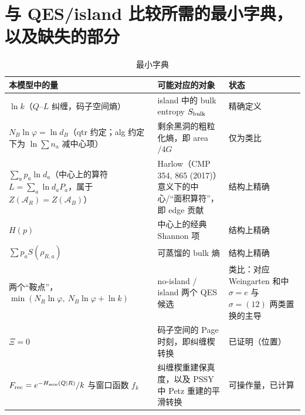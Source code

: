 \documentclass[11pt,a4paper,UTF8]{ctexart}
\newcommand{\Frec}{F_{\rm rec}}
\begin{document}
\section{与 QES/island 比较所需的最小字典，以及缺失的部分}\label{sec:island}

\begin{table}[htbp]
\centering\small
\caption{最小字典}
\begin{tabularx}{\textwidth}{>{\raggedright\arraybackslash}X>{\raggedright\arraybackslash}X>{\raggedright\arraybackslash}p{3.3cm}}
\toprule
本模型中的量 & 可能对应的对象 & 状态\\
\midrule
$\ln k$（$Q$--$L$ 纠缠，码子空间熵） & island 中的 bulk entropy $S_{\rm bulk}$ & 精确定义\\
$N_B\ln\varphi=\ln d_B$（qtr 约定；alg 约定下为 $\ln\sum n_a$ 减中心项） & 剩余黑洞的粗粒化熵，即 area$/4G$ & 仅为类比\\
$\sum_ap_a\ln d_a$（中心上的算符 $L=\sum_a\ln d_aP_a$，属于 $Z(\mathcal A_R)=Z(\mathcal A_B)$） & Harlow（CMP 354, 865 (2017)）意义下的中心/“面积算符”，即 edge 贡献 & 结构上精确\\
$H(p)$ & 中心上的经典 Shannon 项 & 结构上精确\\
$\sum p_aS(\rho_{R,a})$ & 可蒸馏的 bulk 熵 & 结构上精确\\
两个“鞍点”，$\min(N_R\ln\varphi,\ N_B\ln\varphi+\ln k)$ & no-island / island 两个 QES 候选 & 类比：对应 Weingarten 和中 $\sigma=e$ 与 $\sigma=(12)$ 两类置换的主导\\
$\Xi=0$ & 码子空间的 Page 时刻，即纠缠楔转换 & 已证明（位置）\\
$\Frec=e^{-H_{\min}(Q|R)}/k$ 与窗口函数 $f_k$ & 纠缠楔重建保真度，以及 PSSY 中 Petz 重建的平滑转换 & 可操作量，已计算\\
\bottomrule
\end{tabularx}
\end{table}
\end{document}
